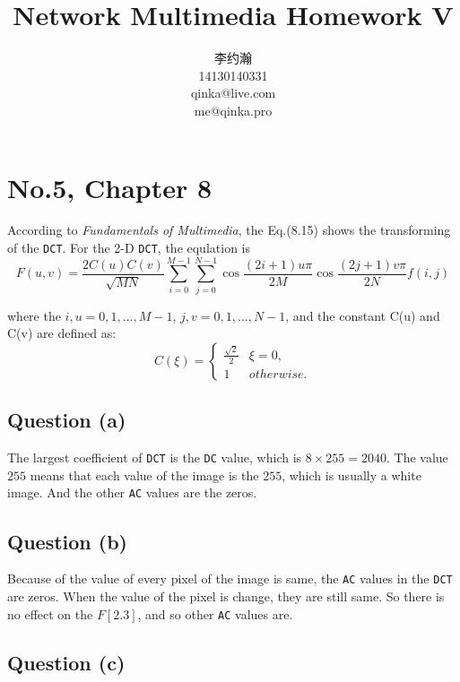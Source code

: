 \documentclass{article}
\title{Network Multimedia Homework V}
\author{李约瀚 \\ 14130140331 \\ qinka@live.com \\ me@qinka.pro}
\def\vFundamentalsOfMutimedia{\textit{Fundamentals of Multimedia}}
\begin{document}
    \maketitle
    
    \section{No.5, Chapter 8}
    According to \vFundamentalsOfMutimedia, the Eq.(8.15) shows the transforming of the \verb|DCT|.
    For the 2-D \verb|DCT|, the equlation is 
    \begin{equation}
    \label{eq:dct:baseeq}
    F(u,v) = \frac{2C(u)C(v)}{\sqrt{MN}}\sum\limits_{i=0}^{M-1}\sum\limits_{j=0}^{N-1}\cos\frac{(2i+1)u\pi}{2M}\cos\frac{(2j+1)v\pi}{2N}f(i,j)
    \end{equation}
    
    where the $i,u = 0,1,\dots,M-1$, $j,v = 0,1,\dots,N-1$, and the constant C(u) and C(v) are defined as:
    \begin{equation}
    C(\xi) = \left\{
    \begin{array}{cl}
    \frac{\sqrt{2}}{2} & \xi = 0, \\
    1 & otherwise.
    \end{array}
    \right.
    \end{equation}
    
    \subsection{Question (a)}
    
    The largest coefficient of \verb|DCT| is the \verb|DC| value, which is $8 \times 255 = 2040$.
    The value $255$ means that each value of the image is the $255$, which is usually
    a white image. And the other \verb|AC| values are the zeros.
    
    \subsection{Question (b)}
    
    Because of the value of every pixel of the image is same, the \verb|AC| values in the \verb|DCT| are zeros. 
    When the value of the pixel is change, they are still same. So there is no effect on the $F[2.3]$, and so other \verb|AC| values are.
    
    \subsection{Question (c)}
    
\end{document}
